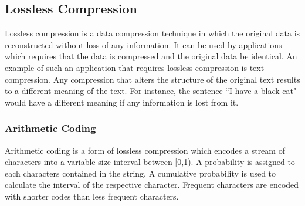 \subsection{Lossless Compression}
Lossless compression \cite{Sayood:2000:IDC:336428} is a data compression technique in which the original data is reconstructed without loss of any information. It can be used by applications which requires that the data is compressed and the original data be identical. An example of such an application that requires lossless compression is text compression.  Any compression that alters the structure of the original text results to a different meaning of the text. For instance, the sentence ``I have a black cat" would have a different meaning if any information is lost from it.



\subsubsection{Arithmetic Coding}

Arithmetic coding is a form of lossless compression which encodes a stream of characters into a variable size interval between [0,1). A probability is assigned to each characters contained in the string. A cumulative probability is used to calculate the interval of the respective character. Frequent characters are encoded with shorter codes than less frequent characters. 
